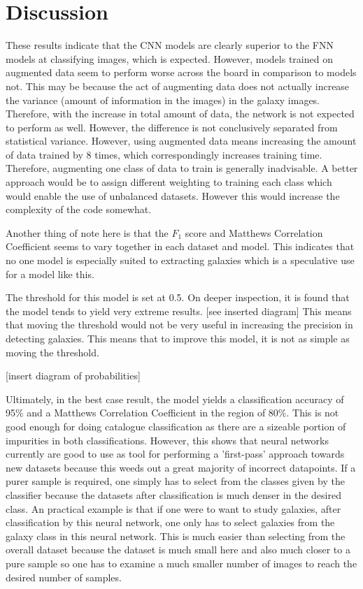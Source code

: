 \documentclass[a4paper,fleqn,usenatbib]{mnras}
\begin{document}
\section{Discussion}
These results indicate that the CNN models are clearly superior to the FNN models at classifying images, which is expected. However, models trained on augmented data seem to perform worse across the board in comparison to models not. This may be because the act of augmenting data does not actually increase the variance (amount of information in the images) in the galaxy images. Therefore, with the increase in total amount of data, the network is not expected to perform as well. However, the difference is not conclusively separated from statistical variance. However, using augmented data means increasing the amount of data trained by 8 times, which correspondingly increases training time. Therefore, augmenting one class of data to train is generally inadvisable. A better approach would be to assign different weighting to training each class which would enable the use of unbalanced datasets. However this would increase the complexity of the code somewhat. 

Another thing of note here is that the $F_1$ score and Matthews Correlation Coefficient seems to vary together in each dataset and model. This indicates that no one model is especially suited to extracting galaxies which is a speculative use for a model like this. 

The threshold for this model is set at 0.5. On deeper inspection, it is found that the model tends to yield very extreme results. [see inserted diagram] This means that moving the threshold would not be very useful in increasing the precision in detecting galaxies. This means that to improve this model, it is not as simple as moving the threshold. 

[insert diagram of probabilities] 

Ultimately, in the best case result, the model yields a classification accuracy of 95\% and a Matthews Correlation Coefficient in the region of 80\%. This is not good enough for doing catalogue classification as there are a sizeable portion of impurities in both classifications. However, this shows that neural networks currently are good to use as tool for performing a 'first-pass' approach towards new datasets because this weeds out a great majority of incorrect datapoints. If a purer sample is required, one simply has to select from the classes given by the classifier because the datasets after classification is much denser in the desired class. An practical example is that if one were to want to study galaxies, after classification by this neural network, one only has to select galaxies from the galaxy class in this neural network. This is much easier than selecting from the overall dataset because the dataset is much small here and also much closer to a pure sample so one has to examine a much smaller number of images to reach the desired number of samples. 
\end{document}
